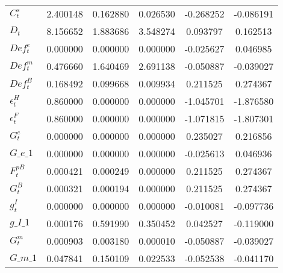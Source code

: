 \begin{center}
\begin{longtable}{lccccc}
$ C^s_t                     $	 & 	        2.400148	 & 	        0.162880	 & 	        0.026530	 & 	       -0.268252	 & 	       -0.086191 \\ 
$ D_t                       $	 & 	        8.156652	 & 	        1.883686	 & 	        3.548274	 & 	        0.093797	 & 	        0.162513 \\ 
$ Def^e_t                   $	 & 	        0.000000	 & 	        0.000000	 & 	        0.000000	 & 	       -0.025627	 & 	        0.046985 \\ 
$ Def^m_t                   $	 & 	        0.476660	 & 	        1.640469	 & 	        2.691138	 & 	       -0.050887	 & 	       -0.039027 \\ 
$ Def^B_t                   $	 & 	        0.168492	 & 	        0.099668	 & 	        0.009934	 & 	        0.211525	 & 	        0.274367 \\ 
$ \epsilon^H_t              $	 & 	        0.860000	 & 	        0.000000	 & 	        0.000000	 & 	       -1.045701	 & 	       -1.876580 \\ 
$ \epsilon^F_t              $	 & 	        0.860000	 & 	        0.000000	 & 	        0.000000	 & 	       -1.071815	 & 	       -1.807301 \\ 
$ G^e_t                     $	 & 	        0.000000	 & 	        0.000000	 & 	        0.000000	 & 	        0.235027	 & 	        0.216856 \\ 
$G\_e\_1                    $	 & 	        0.000000	 & 	        0.000000	 & 	        0.000000	 & 	       -0.025613	 & 	        0.046936 \\ 
$ F^{pB}_t                  $	 & 	        0.000421	 & 	        0.000249	 & 	        0.000000	 & 	        0.211525	 & 	        0.274367 \\ 
$ G^B_t                     $	 & 	        0.000321	 & 	        0.000194	 & 	        0.000000	 & 	        0.211525	 & 	        0.274367 \\ 
$ g^I_t                     $	 & 	        0.000000	 & 	        0.000000	 & 	        0.000000	 & 	       -0.010081	 & 	       -0.097736 \\ 
$g\_I\_1                    $	 & 	        0.000176	 & 	        0.591990	 & 	        0.350452	 & 	        0.042527	 & 	       -0.119000 \\ 
$ G^m_t                     $	 & 	        0.000903	 & 	        0.003180	 & 	        0.000010	 & 	       -0.050887	 & 	       -0.039027 \\ 
$G\_m\_1                    $	 & 	        0.047841	 & 	        0.150109	 & 	        0.022533	 & 	       -0.052538	 & 	       -0.041170 \\ 

\end{longtable}
\end{center}
